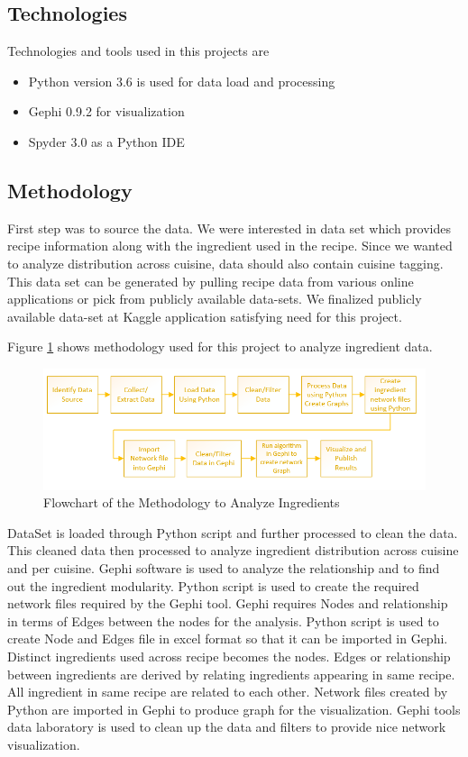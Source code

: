 \documentclass[sigconf]{acmart}
\begin{document}
\subsection{Technologies}
Technologies and tools used in this projects are
\begin{itemize}
\item Python version 3.6 is used for data load and processing
\item Gephi 0.9.2 for visualization
\item Spyder 3.0 as a Python IDE
\end{itemize}

\subsection{Methodology}
First step was to source the data. We were interested in data set which provides recipe information along with the ingredient used in the recipe. Since we wanted to analyze distribution across cuisine, data should also contain cuisine tagging. This data set can be generated by pulling recipe data from various online applications or pick from publicly available data-sets. We finalized publicly available data-set at Kaggle application satisfying need for this project.

Figure \ref{f:methodology} shows methodology used for this project to analyze ingredient data.
\begin{figure}[!ht]
  \centering\includegraphics[width=\columnwidth]{images/methodology.PNG}
  \caption{Flowchart of the Methodology to Analyze Ingredients }\label{f:methodology}
\end{figure}

DataSet is loaded through Python script and further processed to clean the data. This cleaned data then processed to analyze ingredient distribution across cuisine and per cuisine. Gephi software is used to analyze the relationship and to find out the ingredient modularity. Python script is used to create the required network files required by the Gephi tool. Gephi requires Nodes and relationship in terms of Edges between the nodes for the analysis. Python script is used to create Node and Edges file in excel format so that it can be imported in Gephi. Distinct ingredients used across recipe becomes the nodes. Edges or relationship between ingredients are derived by relating ingredients appearing in same recipe. All ingredient in same recipe are related to each other.
Network files created by Python are imported in Gephi to produce graph for the visualization. Gephi tools data laboratory is used to clean up the data and filters to provide nice network visualization. 
\end{document}
